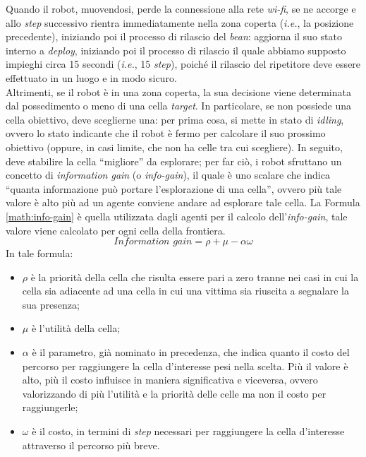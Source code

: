 Quando il robot, muovendosi, perde la connessione alla rete \textit{wi-fi}, se ne accorge e allo \textit{step} successivo rientra immediatamente nella zona coperta (\textit{i.e.}, la posizione precedente), iniziando poi il processo di rilascio del \textit{bean}: aggiorna il suo stato interno a \textit{deploy}, iniziando poi il processo di rilascio il quale abbiamo supposto impieghi circa 15 secondi (\textit{i.e.}, 15 \textit{step}), poiché il rilascio del ripetitore deve essere effettuato in un luogo e in modo sicuro.\\
Altrimenti, se il robot è in una zona coperta, la sua decisione viene determinata dal possedimento o meno di una cella \textit{target}.
In particolare, se non possiede una cella obiettivo, deve sceglierne una: per prima cosa, si mette in stato di \textit{idling}, ovvero lo stato indicante che il robot è fermo per calcolare il suo prossimo obiettivo (oppure, in casi limite, che non ha celle tra cui scegliere).
In seguito, deve stabilire la cella “migliore” da esplorare; per far ciò, i robot sfruttano un concetto di \textit{information gain} (o \textit{info-gain}), il quale è uno scalare che indica “quanta informazione può portare l'esplorazione di una cella”, ovvero più tale valore è alto più ad un agente conviene andare ad esplorare tale cella. 
La Formula \ref{math:info-gain} è quella utilizzata dagli agenti per il calcolo dell'\textit{info-gain}, tale valore viene calcolato per ogni cella della frontiera.
\begin{equation}
	\label{math:info-gain}
	\textit{Information gain} = \rho+\mu-\alpha\omega
\end{equation}
In tale formula:
\begin{itemize}
	\item $\rho$ è la priorità della cella che risulta essere pari a zero tranne nei casi in cui la cella sia adiacente ad una cella in cui una vittima sia riuscita a segnalare la sua presenza;
	\item $\mu$ è l'utilità della cella;
	\item $\alpha$ è il parametro, già nominato in precedenza, che indica quanto il costo del percorso per raggiungere la cella d'interesse pesi nella scelta. Più il valore è alto, più il costo influisce in maniera significativa e viceversa, ovvero valorizzando di più l'utilità e la priorità delle celle ma non il costo per raggiungerle;
	\item $\omega$ è il costo, in termini di \textit{step} necessari per raggiungere la cella d'interesse attraverso il percorso più breve. 
\end{itemize}
